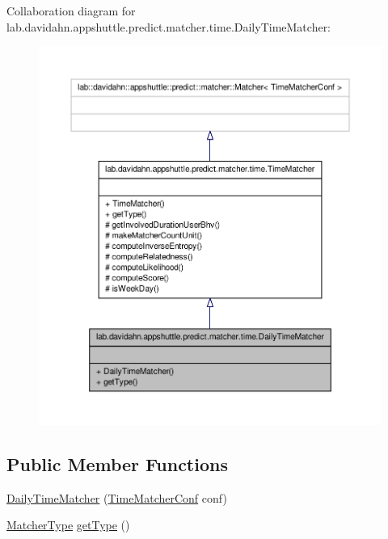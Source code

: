 \-Collaboration diagram for lab.\-davidahn.\-appshuttle.\-predict.\-matcher.\-time.\-Daily\-Time\-Matcher\-:
\nopagebreak
\begin{figure}[H]
\begin{center}
\leavevmode
\includegraphics[width=350pt]{classlab_1_1davidahn_1_1appshuttle_1_1predict_1_1matcher_1_1time_1_1_daily_time_matcher__coll__graph}
\end{center}
\end{figure}
\subsection*{\-Public \-Member \-Functions}
\begin{DoxyCompactItemize}
\item 
\hyperlink{classlab_1_1davidahn_1_1appshuttle_1_1predict_1_1matcher_1_1time_1_1_daily_time_matcher_ad3b28298400197fd2e197d48774c8673}{\-Daily\-Time\-Matcher} (\hyperlink{classlab_1_1davidahn_1_1appshuttle_1_1predict_1_1matcher_1_1time_1_1_time_matcher_conf}{\-Time\-Matcher\-Conf} conf)
\item 
\hyperlink{enumlab_1_1davidahn_1_1appshuttle_1_1predict_1_1matcher_1_1_matcher_type}{\-Matcher\-Type} \hyperlink{classlab_1_1davidahn_1_1appshuttle_1_1predict_1_1matcher_1_1time_1_1_daily_time_matcher_aae84e38493b36082088d3d6a5dd24eb7}{get\-Type} ()
\end{DoxyCompactItemize}


